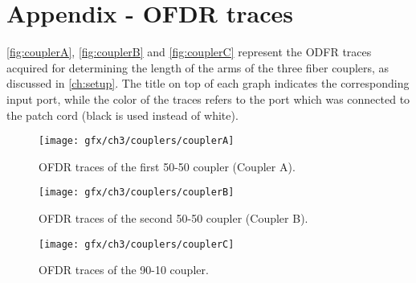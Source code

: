 
\chapter{Appendix - OFDR traces}
\label{ch:appendixA}
 \autoref{fig:couplerA}, \autoref{fig:couplerB} and \autoref{fig:couplerC} represent the ODFR traces acquired for determining the length of the arms of the three fiber couplers, as discussed in \autoref{ch:setup}. The title on top of each graph indicates the corresponding input port, while the color of the traces refers to the port which was connected to the patch cord (black is used  instead of white).
 
\begin{figure}[hbt]
	\myfloatalign
	\texttt{[image: gfx/ch3/couplers/couplerA]}
	\caption{OFDR traces of the first 50-50 coupler (Coupler A).}\label{fig:couplerA}
\end{figure}

\begin{figure}[hbt]
	\myfloatalign
	\texttt{[image: gfx/ch3/couplers/couplerB]}
	\caption{OFDR traces of the second 50-50 coupler (Coupler B).}\label{fig:couplerB}
\end{figure}

\begin{figure}[hbt]
	\myfloatalign
	\texttt{[image: gfx/ch3/couplers/couplerC]}
	\caption{OFDR traces of the 90-10 coupler.}\label{fig:couplerC}
\end{figure}
